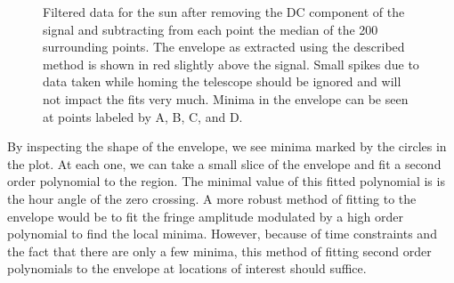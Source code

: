 \documentclass[12pt]{article}
\begin{document}
\begin{figure}[H]
\caption[SODUMB]{Filtered data for the sun after removing the DC component of the signal and subtracting from each point the median of the 200 surrounding points. The envelope as extracted using the described method is shown in red slightly above the signal. Small spikes due to data taken while homing the telescope should be ignored and will not impact the fits very much. Minima in the envelope can be seen at points labeled by A, B, C, and D.}
\label{fig:envelope}
\end{figure}

By inspecting the shape of the envelope, we see minima marked by the circles in the plot. At each one, we can take a small slice of the envelope and fit a second order polynomial to the region. The minimal value of this fitted polynomial is is the hour angle of the zero crossing. A more robust method of fitting to the envelope would be to fit the fringe amplitude modulated by a high order polynomial to find the local minima. However, because of time constraints and the fact that there are only a few minima, this method of fitting second order polynomials to the envelope at locations of interest should suffice.
\end{document}
